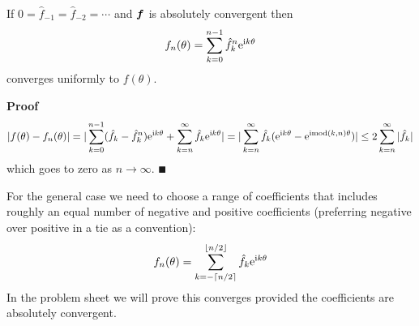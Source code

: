 \begin{theorem} If $0 = \hat f_{-1} = \hat f_{-2} = \ensuremath{\cdots}$ and ${\mbox{\boldmath$f$\unboldmath}}$ is absolutely convergent then
\[
f_n(\ensuremath{\theta}) = \ensuremath{\sum}_{k=0}^{n-1} \hat f_k^n {\rm e}^{{\rm i} k \ensuremath{\theta}}
\]
converges uniformly to $f(\ensuremath{\theta})$.

\end{theorem}
\textbf{Proof}
\begin{align*}
|f(\ensuremath{\theta}) - f_n(\ensuremath{\theta})| = |\ensuremath{\sum}_{k=0}^{n-1} (\hat f_k - \hat f_k^n) {\rm e}^{{\rm i} k \ensuremath{\theta}} + \ensuremath{\sum}_{k=n}^\ensuremath{\infty} \hat f_k {\rm e}^{{\rm i} k \ensuremath{\theta}}|
= |\ensuremath{\sum}_{k=n}^\ensuremath{\infty} \hat f_k ({\rm e}^{{\rm i} k \ensuremath{\theta}} - {\rm e}^{{\rm i} {\rm mod}(k,n) \ensuremath{\theta}})|
\ensuremath{\leq} 2 \ensuremath{\sum}_{k=n}^\ensuremath{\infty} |\hat f_k|
\end{align*}
which goes to zero as $n \ensuremath{\rightarrow} \ensuremath{\infty}$. \ensuremath{\QED}

For the general case we need to choose a range of coefficients that includes roughly an equal number of negative and positive coefficients (preferring negative over positive in a tie as a convention):
\[
f_n(\ensuremath{\theta}) = \ensuremath{\sum}_{k=-\ensuremath{\lceil}n/2\ensuremath{\rceil}}^{\ensuremath{\lfloor}n/2\ensuremath{\rfloor}} \hat f_k {\rm e}^{{\rm i} k \ensuremath{\theta}}
\]
In the problem sheet we will prove this converges provided the coefficients are absolutely convergent.




